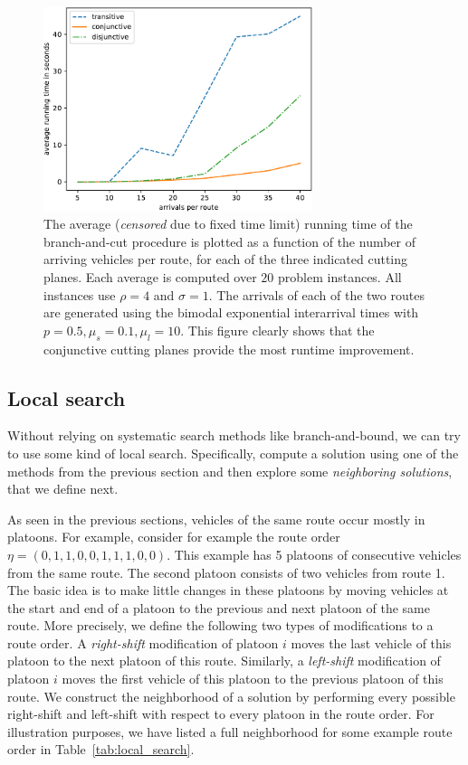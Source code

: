 \documentclass[a4paper]{article}
\theoremstyle{definition}
\theoremstyle{plain}
\begin{document}
\begin{figure}
  \centering
  \includegraphics[width=0.7\textwidth]{data-single/running_times.pdf}
  \caption{The average (\textit{censored} due to fixed time limit) running time
    of the branch-and-cut procedure is plotted as a function of the number of
    arriving vehicles per route, for each of the three indicated cutting planes.
    Each average is computed over $20$ problem instances. All instances use
    $\rho = 4$ and $\sigma = 1$. The arrivals of each of the two routes are generated
    using the bimodal exponential interarrival times with
    $p=0.5, \mu_{s} = 0.1, \mu_{l} = 10$. This figure clearly shows that the
    conjunctive cutting planes provide the most runtime improvement.}
  \label{fig:running_time}
\end{figure}

\subsection{Local search}
\label{sec:local_search}

Without relying on systematic search methods like branch-and-bound, we can try
to use some kind of local search. Specifically, compute a solution using one of
the methods from the previous section and then explore some \textit{neighboring
  solutions}, that we define next.

As seen in the previous sections, vehicles of the same route occur mostly in
platoons. For example, consider for example the route order
$\eta = (0, 1, 1, 0, 0, 1, 1, 1, 0, 0)$. This example has 5 platoons of consecutive
vehicles from the same route. The second platoon consists of two vehicles from
route 1.
The basic idea is to make little changes in these platoons by moving vehicles at
the start and end of a platoon to the previous and next platoon of the same
route.
%
More precisely, we define the following two types of modifications to a route
order. A \textit{right-shift} modification of platoon $i$ moves the last vehicle of this
platoon to the next platoon of this route. Similarly, a \textit{left-shift} modification
of platoon $i$ moves the first vehicle of this platoon to the previous platoon
of this route.
%
We construct the neighborhood of a solution by performing every possible
right-shift and left-shift with respect to every platoon in the route order. For
illustration purposes, we have listed a full neighborhood for some example route
order in Table~\ref{tab:local_search}.
\end{document}
